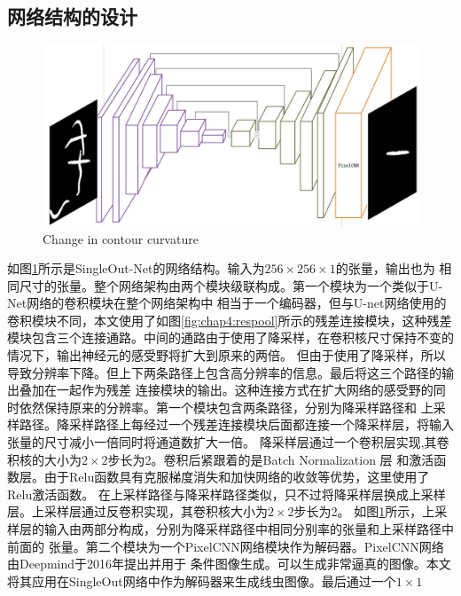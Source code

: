 \subsection{网络结构的设计}
\label{archtecture}
\begin{figure}[htb]
	  \centering
	  \includegraphics[width=14cm]{figure/chap4/arch1.jpg}
		{Change in contour curvature}
	  \label{fig:chap4:netarch}
	\end{figure}
	如图\ref{fig:chap4:netarch}所示是SingleOut-Net的网络结构。输入为$256\times256\times1$的张量，输出也为
	相同尺寸的张量。整个网络架构由两个模块级联构成。第一个模块为一个类似于U-Net网络\cite{ronneberger2015u}的卷积模块在整个网络架构中
	相当于一个编码器，但与U-net网络使用的卷积模块不同，本文使用了如图\ref{fig:chap4:respool}所示的残差连接模块\cite{chu2017multi}，这种残差
	模块包含三个连接通路。中间的通路由于使用了降采样，在卷积核尺寸保持不变的情况下，输出神经元的感受野将扩大到原来的两倍。
	但由于使用了降采样，所以导致分辨率下降。但上下两条路径上包含高分辨率的信息。最后将这三个路径的输出叠加在一起作为残差
	连接模块的输出。这种连接方式在扩大网络的感受野的同时依然保持原来的分辨率。第一个模块包含两条路径，分别为降采样路径和
	上采样路径。降采样路径上每经过一个残差连接模块后面都连接一个降采样层，将输入张量的尺寸减小一倍同时将通道数扩大一倍。
	降采样层通过一个卷积层实现,其卷积核的大小为$2\times2$步长为2。卷积后紧跟着的是Batch Normalization 层
	和激活函数层。由于Relu函数\cite{xu2015empirical}具有克服梯度消失和加快网络的收敛等优势，这里使用了Relu激活函数。
	在上采样路径与降采样路径类似，只不过将降采样层换成上采样层。上采样层通过反卷积实现，其卷积核大小为$2\times2$步长为2。
	如图\ref{fig:chap4:netarch}所示，上采样层的输入由两部分构成，分别为降采样路径中相同分别率的张量和上采样路径中前面的
	张量。第二个模块为一个PixelCNN网络\cite{van2016conditional}模块作为解码器。PixelCNN网络由Deepmind于2016年提出并用于
	条件图像生成。可以生成非常逼真的图像。本文将其应用在SingleOut网络中作为解码器来生成线虫图像。最后通过一个$1\times1$

